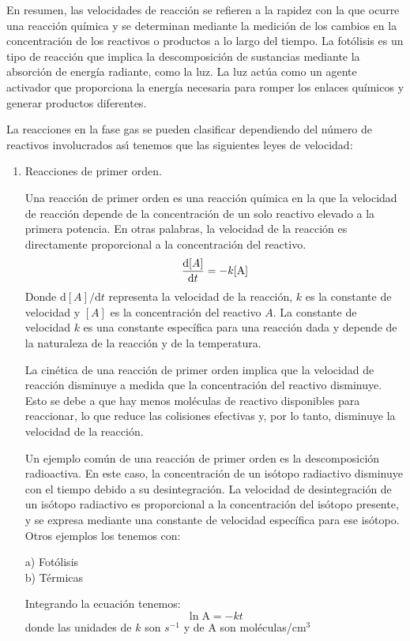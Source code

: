En resumen, las velocidades de reacción se refieren a la rapidez con la que ocurre una reacción química y se determinan mediante la medición de los cambios en la concentración de los reactivos o productos a lo largo del tiempo. La fotólisis es un tipo de reacción que implica la descomposición de sustancias mediante la absorción de energía radiante, como la luz. La luz actúa como un agente activador que proporciona la energía necesaria para romper los enlaces químicos y generar productos diferentes.

La reacciones en la fase gas se pueden clasificar dependiendo del n\'umero de reactivos involucrados as\'{\i} tenemos que las siguientes leyes de velocidad:
\begin{enumerate}
\item Reacciones de primer orden.

Una reacción de primer orden es una reacción química en la que la velocidad de reacción depende de la concentración de un solo reactivo elevado a la primera potencia. En otras palabras, la velocidad de la reacción es directamente proporcional a la concentración del reactivo.
	 \begin{equation*}
	\frac{\mathrm{d}\textrm[A]}{\mathrm{d}t}=-k[\textrm{A}]
	\end{equation*}
Donde $\mathrm{d}[A]/\mathrm{d}t$ representa la velocidad de la reacción, $k$ es la constante de velocidad y $[A]$ es la concentración del reactivo $A$. La constante de velocidad $k$ es una constante específica para una reacción dada y depende de la naturaleza de la reacción y de la temperatura.

La cinética de una reacción de primer orden implica que la velocidad de reacción disminuye a medida que la concentración del reactivo disminuye. Esto se debe a que hay menos moléculas de reactivo disponibles para reaccionar, lo que reduce las colisiones efectivas y, por lo tanto, disminuye la velocidad de la reacción.

Un ejemplo común de una reacción de primer orden es la descomposición radioactiva. En este caso, la concentración de un isótopo radiactivo disminuye con el tiempo debido a su desintegración. La velocidad de desintegración de un isótopo radiactivo es proporcional a la concentración del isótopo presente, y se expresa mediante una constante de velocidad específica para ese isótopo. Otros ejemplos los tenemos con:
	\begin{description}
		\item[a) Fot\'olisis]  
		\item[b) T\'ermicas] 
	\end{description}
Integrando la ecuaci\'on tenemos:
	\begin{equation*}
	\ln \textrm{A} = -kt
	\end{equation*}
	donde las unidades de $k$ son $s^{-1}$ y de A  son moléculas/cm$^3$
	

\end{enumerate}
